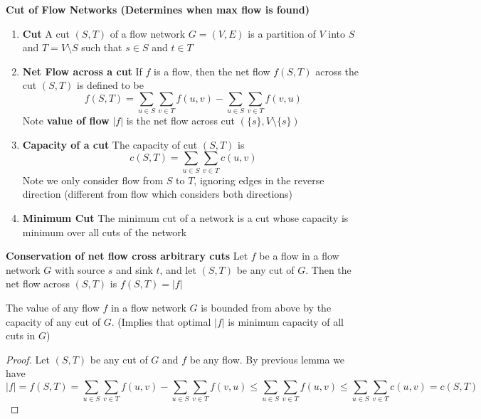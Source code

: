 \documentclass[11pt]{article}
\begin{document}
\begin{defn*}
    \textbf{Cut of Flow Networks (Determines when max flow is found)} 
    \begin{enumerate}
        \item \textbf{Cut} A cut $(S,T)$ of a flow network $G = (V,E)$ is a partition of $V$ into $S$ and $T = V \setminus S$ such that $s\in S$ and $t\in T$
        \item \textbf{Net Flow across a cut} If $f$ is a flow, then the net flow $f(S,T)$ across the cut $(S,T)$ is defined to be 
        \[
            f(S,T) = \sum_{u\in S} \sum_{v\in T} f(u,v) - \sum_{u\in S}\sum_{v\in T} f(v,u)
        \]
        Note \textbf{value of flow} $|f|$ is the net flow across cut $(\{s\}, V\setminus \{s\})$
        \item \textbf{Capacity of a cut} The capacity of cut $(S,T)$ is 
        \[
            c(S,T) = \sum_{u\in S} \sum_{v\in T} c(u,v)
        \]
        Note we only consider flow from $S$ to $T$, ignoring edges in the reverse direction (different from flow which considers both directions)
        \item \textbf{Minimum Cut} The minimum cut of a network is a cut whose capacity is minimum over all cuts of the network
    \end{enumerate}
\end{defn*}

\begin{lemma*} \textbf{Conservation of net flow cross arbitrary cuts}
    Let $f$ be a flow in a flow network $G$ with source $s$ and sink $t$, and let $(S,T)$ be any cut of $G$. Then the net flow across $(S,T)$ is $f(S,T) = |f|$
\end{lemma*}

\begin{corollary*}
    The value of any flow $f$ in a flow network $G$ is bounded from above by the capacity of any cut of $G$. (Implies that optimal $|f|$ is minimum capacity of all cuts in $G$)
    \begin{proof}
        Let $(S,T)$ be any cut of $G$ and $f$ be any flow. By previous lemma we have 
        \[
            |f| = f(S,T) = \sum_{u\in S} \sum_{v\in T} f(u,v) - \sum_{u\in S}\sum_{v\in T} f(v,u) \leq \sum_{u\in S} \sum_{v\in T} f(u,v) \leq \sum_{u\in S} \sum_{v\in T} c(u,v) = c(S,T)
        \]
    \end{proof}
\end{corollary*}
\end{document}

